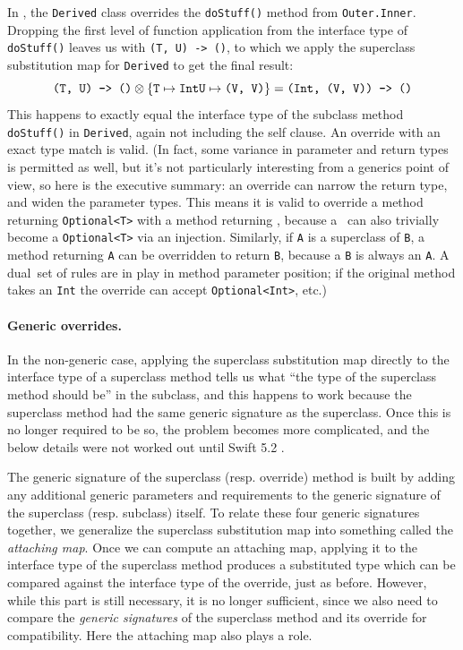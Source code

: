 \documentclass[../generics]{subfiles}
\begin{document}
In , the \texttt{Derived} class overrides the \texttt{doStuff()} method from \texttt{Outer.Inner}. Dropping the first level of function application from the interface type of \texttt{doStuff()} leaves us with \texttt{(T, U) -> ()}, to which we apply the superclass substitution map for \texttt{Derived} to get the final result:
\[
\texttt{(T, U) -> ()} \otimes
\{
\texttt{T} \mapsto \texttt{Int}\\
\texttt{U} \mapsto \texttt{(V, V)}
\} =
\texttt{(Int, (V, V)) -> ()}
\]
This happens to exactly equal the interface type of the subclass method \texttt{doStuff()} in \texttt{Derived}, again not including the self clause. An override with an exact type match is valid. (In fact, some variance in parameter and return types is permitted as well, but it's not particularly interesting from a generics point of view, so here is the executive summary: an override can narrow the return type, and widen the parameter types. This means it is valid to override a method returning \texttt{Optional<T>} with a method returning \tT, because a \tT\ can also trivially become a \texttt{Optional<T>} via an injection. Similarly, if \texttt{A} is a superclass of \texttt{B}, a method returning \texttt{A} can be overridden to return \texttt{B}, because a \texttt{B} is always an \texttt{A}. A dual set of rules are in play in method parameter position; if the original method takes an \texttt{Int} the override can accept \texttt{Optional<Int>}, etc.)

\paragraph{Generic overrides.}

In the non-generic case, applying the superclass substitution map directly to the interface type of a superclass method tells us what ``the type of the superclass method should be'' in the subclass, and this happens to work because the superclass method had the same generic signature as the superclass. Once this is no longer required to be so, the problem becomes more complicated, and the below details were not worked out until Swift 5.2 \cite{sr4206}.

The generic signature of the superclass (resp. override) method is built by adding any additional generic parameters and requirements to the generic signature of the superclass (resp. subclass) itself. To relate these four generic signatures together, we generalize the superclass substitution map into something called the \emph{attaching map}. Once we can compute an attaching map, applying it to the interface type of the superclass method produces a substituted type which can be compared against the interface type of the override, just as before. However, while this part is still necessary, it is no longer sufficient, since we also need to compare the \emph{generic signatures} of the superclass method and its override for compatibility. Here the attaching map also plays a role.
\end{document}

